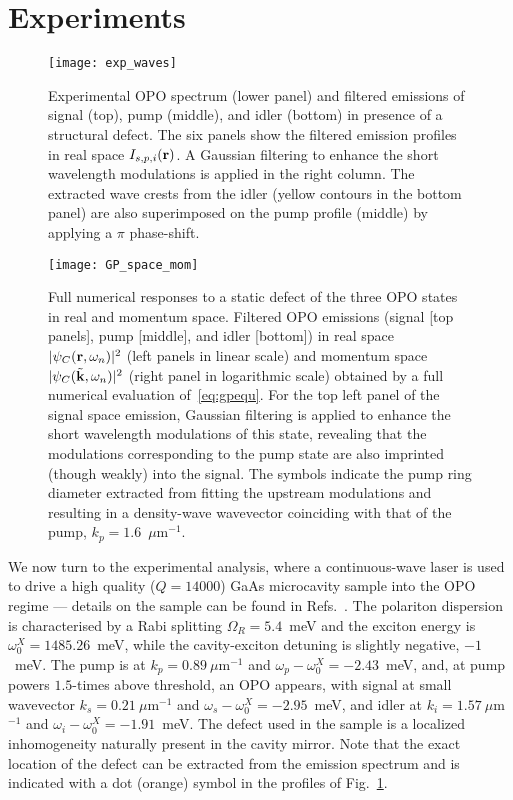 \section{Experiments}
%
\begin{figure}[tb]\centering
  \texttt{[image: exp\_waves]}
  \caption{Experimental OPO spectrum (lower panel) and filtered
    emissions of signal (top), pump (middle), and idler (bottom) in
    presence of a structural defect. The six panels show the filtered
    emission profiles in real space $I_{s, p,i}(\mathbf{r})$. A Gaussian
    filtering to enhance the short wavelength modulations is applied
    in the right column. The extracted wave crests from the idler
    (yellow contours in the bottom panel) are also superimposed on the
    pump profile (middle) by applying a $\pi$ phase-shift.}
\label{fig:exper}
\end{figure}
%
%
\begin{figure}[tb]
\centering
\texttt{[image: GP\_space\_mom]}
\caption{Full numerical responses to a static defect of
  the three OPO states in real and momentum space. Filtered OPO
  emissions (signal [top panels], pump [middle], and idler [bottom])
  in real space $|\psi_C (\mathbf{r},\omega_n)|^2$ (left panels in
  linear scale) and momentum space $|\psi_C
  (\tilde{\mathbf{k}},\omega_n)|^2$ (right panel in logarithmic scale)
  obtained by a full numerical evaluation of~\eqref{eq:gpequ}. For the
  top left panel of the signal space emission, Gaussian filtering is
  applied to enhance the short wavelength modulations of this state,
  revealing that the modulations corresponding to the pump state are
  also imprinted (though weakly) into the signal. The symbols indicate
  the pump ring diameter extracted from fitting the upstream
  modulations and resulting in a density-wave wavevector coinciding
  with that of the pump, $k_p=1.6$~$\mu$m$^{-1}$.}
\label{fig:numer}
\end{figure}
%
We now turn to the experimental analysis, where a continuous-wave
laser is used to drive a high quality ($Q=14000$) GaAs microcavity
sample into the OPO regime --- details on the sample can be found in
Refs.~\cite{Ballarini_2013,Dominici_2014}.
The polariton dispersion is characterised by a Rabi splitting
$\Omega_R=5.4$~meV and the exciton energy is
$\omega_0^{X}=1485.26$~meV, while the cavity-exciton detuning is
slightly negative, $-1$~meV. The pump is at $k_p=0.89~\mu$m$^{-1}$ and
$\omega_p - \omega_0^{X}=-2.43$~meV, and, at pump powers $1.5$-times
above threshold, an OPO appears, with signal at small wavevector
$k_s=0.21~\mu$m$^{-1}$ and $\omega_s - \omega_0^{X}=-2.95$~meV, and
idler at $k_i=1.57~\mu$m$^{-1}$ and
$\omega_i - \omega_0^{X}=-1.91$~meV.
%
The defect used in the sample is a localized inhomogeneity naturally
present in the cavity mirror. Note that the exact location of the
defect can be extracted from the emission spectrum and is indicated
with a dot (orange) symbol in the profiles of Fig.~\ref{fig:exper}.

